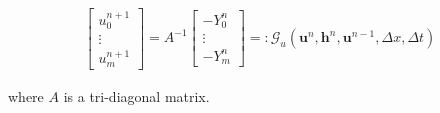 \documentclass[SingleSpace,12pt,Journal]{Serre_ASCE}
\begin{document}
\begin{linenomath*}
\begin{gather}
\left[\begin{array}{c}
 u^{n+1}_0 \\
 \vdots \\
 u^{n+1}_m \end{array}\right]
 = A^{-1} \left[\begin{array}{c}
  -Y^n_0 \\
  \vdots \\
  -Y^n_m \end{array}\right] =: \mathcal{G}_u\left(\boldsymbol{u}^n,\boldsymbol{h}^n, \boldsymbol{u}^{n-1}, \Delta x, \Delta t \right)
\label{eq:FDcentforu}
\end{gather}
\end{linenomath*}
where $A$ is a tri-diagonal matrix.
\end{document}
